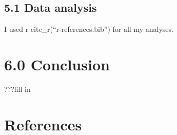 \documentclass[
  ,man,floatsintext]{apa6}
\begin{document}
\subsection{5.1 Data analysis}\label{data-analysis}

I used r cite\_r(``r-references.bib'') for all my analyses.

\section{6.0 Conclusion}\label{conclusion}

???fill in

\section{References}\label{references}

\setlength{\parindent}{-0.5in}
\setlength{\leftskip}{0.5in}


\clearpage
\renewcommand{\listfigurename}{Figure captions}

\clearpage
\renewcommand{\listtablename}{Table captions}
\end{document}
